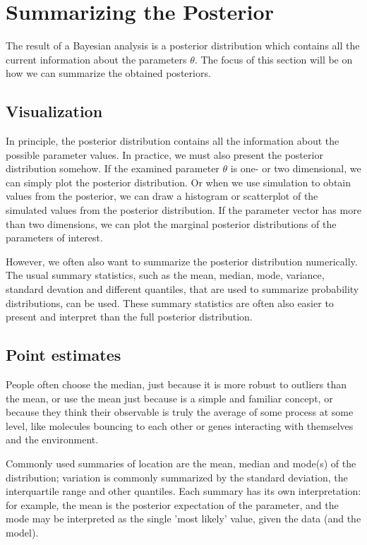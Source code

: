\section{Summarizing the Posterior}

The result of a Bayesian analysis is a posterior distribution which contains all the current information about the parameters $\theta$. The focus of this section will be on how we can summarize the obtained posteriors.%


\subsection{Visualization} 




In principle, the posterior distribution contains all the information about the possible parameter values. In practice, we must also present the posterior distribution somehow. If the examined parameter $\theta$
  is one- or two dimensional, we can simply plot the posterior distribution. Or when we use simulation to obtain values from the posterior, we can draw a histogram or scatterplot of the simulated values from the posterior distribution. If the parameter vector has more than two dimensions, we can plot the marginal posterior distributions of the parameters of interest.
  
 However, we often also want to summarize the posterior distribution numerically. The usual summary statistics, such as the mean, median, mode, variance, standard devation and different quantiles, that are used to summarize probability distributions, can be used. These summary statistics are often also easier to present and interpret than the full posterior distribution.

\subsection{Point estimates}

People often choose the median, just because it is more robust to outliers than the mean, or use the mean just because is a simple and familiar concept, or because they think their observable is truly the average of some process at some level, like molecules bouncing to each other or genes interacting with themselves and the environment.

Commonly used summaries of location are the mean, median and mode(s) of the distribution; variation is commonly summarized by the standard deviation, the interquartile range and other quantiles. Each summary has its own interpretation: for example, the mean is the posterior expectation of the parameter, and the mode may be interpreted as the single 'most likely' value, given the data (and the model).

